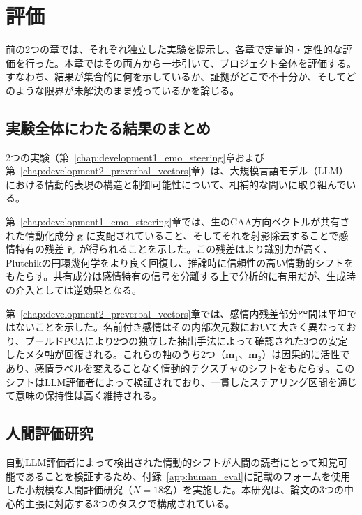\chapter{評価}
\label{chap:evaluation}

前の2つの章では、それぞれ独立した実験を提示し、各章で定量的・定性的な評価を行った。本章ではその両方から一歩引いて、プロジェクト全体を評価する。すなわち、結果が集合的に何を示しているか、証拠がどこで不十分か、そしてどのような限界が未解決のまま残っているかを論じる。

\section{実験全体にわたる結果のまとめ}

2つの実験（第~\ref{chap:development1_emo_steering}章および第~\ref{chap:development2_preverbal_vectors}章）は、大規模言語モデル（LLM）における情動的表現の構造と制御可能性について、相補的な問いに取り組んでいる。\par

第~\ref{chap:development1_emo_steering}章では、生のCAA方向ベクトルが共有された情動化成分 $\mathbf{g}$ に支配されていること、そしてそれを射影除去することで感情特有の残差 $\hat{\mathbf{r}}_e$ が得られることを示した。この残差はより識別力が高く、Plutchikの円環幾何学をより良く回復し、推論時に信頼性の高い情動的シフトをもたらす。共有成分は感情特有の信号を分離する上で分析的に有用だが、生成時の介入としては逆効果となる。\par

第~\ref{chap:development2_preverbal_vectors}章では、感情内残差部分空間は平坦ではないことを示した。名前付き感情はその内部次元数において大きく異なっており、プールドPCAにより2つの独立した抽出手法によって確認された3つの安定したメタ軸が回復される。これらの軸のうち2つ（$\mathbf{m}_1$、$\mathbf{m}_2$）は因果的に活性であり、感情ラベルを変えることなく情動的テクスチャのシフトをもたらす。このシフトはLLM評価者によって検証されており、一貫したステアリング区間を通じて意味の保持性は高く維持される。\par


\section{人間評価研究}
\label{sec:eval-human}

自動LLM評価者によって検出された情動的シフトが人間の読者にとって知覚可能であることを検証するため、付録~\ref{app:human_eval}に記載のフォームを使用した小規模な人間評価研究（$N=18$名）を実施した。本研究は、論文の3つの中心的主張に対応する3つのタスクで構成されている。

